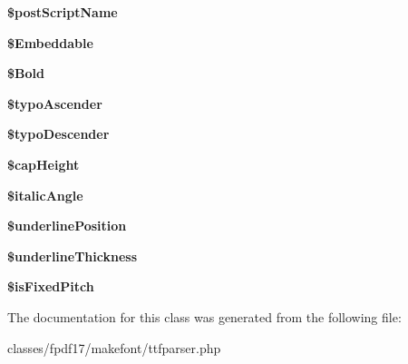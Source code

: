 \begin{DoxyCompactItemize}
\item 
\hypertarget{classTTFParser_ac67943b8655cae5c6ba81e7217abc04f}{}{\bfseries \$post\+Script\+Name}\label{classTTFParser_ac67943b8655cae5c6ba81e7217abc04f}

\item 
\hypertarget{classTTFParser_a511b00b1e6ca4011fe26e6d77ff542ea}{}{\bfseries \$\+Embeddable}\label{classTTFParser_a511b00b1e6ca4011fe26e6d77ff542ea}

\item 
\hypertarget{classTTFParser_a06cdff8e5c477c1953b59f9136ebe18f}{}{\bfseries \$\+Bold}\label{classTTFParser_a06cdff8e5c477c1953b59f9136ebe18f}

\item 
\hypertarget{classTTFParser_a2e6d7caa84b7c678d3c475f71ec81528}{}{\bfseries \$typo\+Ascender}\label{classTTFParser_a2e6d7caa84b7c678d3c475f71ec81528}

\item 
\hypertarget{classTTFParser_a7f2b6f4e0e71e6284255c46beb24586d}{}{\bfseries \$typo\+Descender}\label{classTTFParser_a7f2b6f4e0e71e6284255c46beb24586d}

\item 
\hypertarget{classTTFParser_af01d90cd33a90e906db3bcbd63d78a54}{}{\bfseries \$cap\+Height}\label{classTTFParser_af01d90cd33a90e906db3bcbd63d78a54}

\item 
\hypertarget{classTTFParser_a00bf745d03b39f24fb36f94f14083d62}{}{\bfseries \$italic\+Angle}\label{classTTFParser_a00bf745d03b39f24fb36f94f14083d62}

\item 
\hypertarget{classTTFParser_aa5db12337eeb53a2a0e33071dbe69e98}{}{\bfseries \$underline\+Position}\label{classTTFParser_aa5db12337eeb53a2a0e33071dbe69e98}

\item 
\hypertarget{classTTFParser_a676721af52dd3748c9e0fdbd3056883d}{}{\bfseries \$underline\+Thickness}\label{classTTFParser_a676721af52dd3748c9e0fdbd3056883d}

\item 
\hypertarget{classTTFParser_a939aa940d419002839e55f20ffd34b0a}{}{\bfseries \$is\+Fixed\+Pitch}\label{classTTFParser_a939aa940d419002839e55f20ffd34b0a}

\end{DoxyCompactItemize}


The documentation for this class was generated from the following file\+:\begin{DoxyCompactItemize}
\item 
classes/fpdf17/makefont/ttfparser.\+php\end{DoxyCompactItemize}
